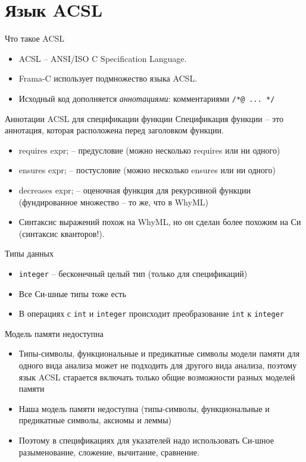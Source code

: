 \documentclass[hyperref={unicode=true}]{beamer}
\begin{document}
    \section{Язык ACSL}

    \begin{frame}{Что такое ACSL}
    \begin{itemize}
    \item
    ACSL -- ANSI/ISO C Specification Language.
    \item
    Frama-C использует подмножество языка ACSL.
    \item
    Исходный код дополняется \emph{аннотациями}:
    комментариями \texttt{/*@ ... */}
    \end{itemize}
    \end{frame}

    \begin{frame}{Аннотации ACSL для спецификации функции}
    Спецификация функции -- это аннотация, которая
    расположена перед заголовком функции.
    \begin{itemize}
    \item
    requires expr; -- предусловие (можно несколько requires или ни одного)
    \item
    ensures expr; -- постусловие (можно несколько ensures или ни одного)
    \item
    decreases expr; -- оценочная функция для рекурсивной функции
    (фундированное множество -- то же, что в WhyML)
    \item
    Синтаксис выражений похож на WhyML, но он сделан более
    похожим на Си (синтаксис кванторов!).
    \end{itemize}
    \end{frame}

    \begin{frame}{Типы данных}
    \begin{itemize}
    \item
    \texttt{integer} -- бесконечный целый тип (только для спецификаций)
    \item
    Все Си-шные типы тоже есть
    \item
    В операциях с \texttt{int} и \texttt{integer} происходит преобразование
    \texttt{int} к \texttt{integer}
    \end{itemize}
    \end{frame}

    \begin{frame}{Модель памяти недоступна}
    \begin{itemize}
    \item
    Типы-символы, функциональные и предикатные символы
    модели памяти для одного вида анализа может не подходить
    для другого вида анализа, поэтому язык ACSL старается
    включать только общие возможности разных моделей памяти
    \item
    Наша модель памяти недоступна (типы-символы, функциональные
    и предикатные символы, аксиомы и леммы)
    \item
    Поэтому в спецификациях для указателей
    надо использовать Си-шное разыменование, сложение, вычитание,
    сравнение.
    \end{itemize}
    \end{frame}
\end{document}
